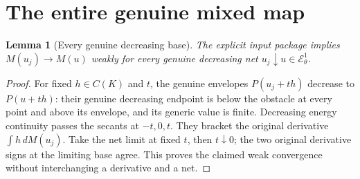 \documentclass[11pt]{article}
\newtheorem{lemma}[theorem]{Lemma}
\newcommand{\EE}{\mathcal E^1_\theta}
\begin{document}
\section{The entire genuine mixed map}
\begin{lemma}[Every genuine decreasing base]\label{decreasing}
The explicit input package implies $M(u_j)\to M(u)$ weakly for
every genuine decreasing net $u_j\downarrow u\in\EE$.
\end{lemma}
\begin{proof}
For fixed $h\in C(K)$ and $t$, the genuine envelopes
$P(u_j+th)$ decrease to $P(u+th)$:
their genuine decreasing endpoint is below the obstacle at every
point and above its envelope, and its generic value is finite.
Decreasing energy continuity passes the secants at $-t,0,t$.
They bracket the original derivative $\int h\,dM(u_j)$.
Take the net limit at fixed $t$, then $t\downarrow0$; the
two original derivative signs at the limiting base agree.
This proves the claimed weak convergence without interchanging
a derivative and a net.
\end{proof}
\end{document}
